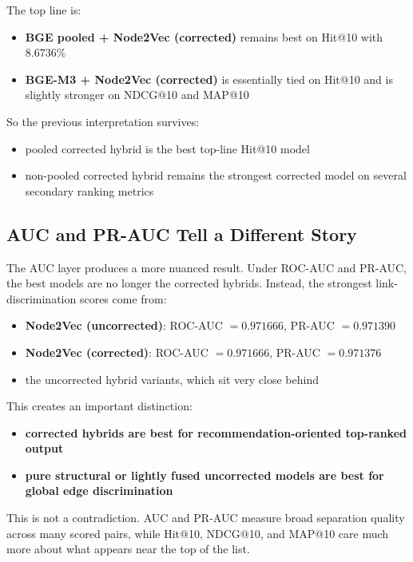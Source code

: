 \documentclass[11pt,a4paper]{article}
\begin{document}
The top line is:

\begin{itemize}
    \item \textbf{BGE pooled + Node2Vec (corrected)} remains best on Hit@10
          with $8.6736\%$
    \item \textbf{BGE-M3 + Node2Vec (corrected)} is essentially tied on Hit@10
          and is slightly stronger on NDCG@10 and MAP@10
\end{itemize}

So the previous interpretation survives:

\begin{itemize}
    \item pooled corrected hybrid is the best top-line Hit@10 model
    \item non-pooled corrected hybrid remains the strongest corrected model on
          several secondary ranking metrics
\end{itemize}

\subsection{AUC and PR-AUC Tell a Different Story}
The AUC layer produces a more nuanced result. Under ROC-AUC and PR-AUC, the
best models are no longer the corrected hybrids. Instead, the strongest
link-discrimination scores come from:

\begin{itemize}
    \item \textbf{Node2Vec (uncorrected)}: ROC-AUC $= 0.971666$, PR-AUC $= 0.971390$
    \item \textbf{Node2Vec (corrected)}: ROC-AUC $= 0.971666$, PR-AUC $= 0.971376$
    \item the uncorrected hybrid variants, which sit very close behind
\end{itemize}

This creates an important distinction:

\begin{itemize}
    \item \textbf{corrected hybrids are best for recommendation-oriented
          top-ranked output}
    \item \textbf{pure structural or lightly fused uncorrected models are best
          for global edge discrimination}
\end{itemize}

This is not a contradiction. AUC and PR-AUC measure broad separation quality
across many scored pairs, while Hit@10, NDCG@10, and MAP@10 care much more
about what appears near the top of the list.
\end{document}
